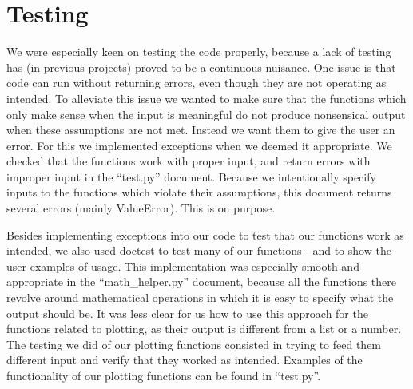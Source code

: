 \documentclass[letterpaper, 12 pt, conference]{ieeeconf}
\begin{document}
\section{Testing}

We were especially keen on testing the code properly, because a lack of testing has (in previous projects) proved to be a continuous nuisance. One issue is that code can run without returning errors, even though they are not operating as intended. To alleviate this issue we wanted to make sure that the functions which only make sense when the input is meaningful do not produce nonsensical output when these assumptions are not met. Instead we want them to give the user an error. For this we implemented exceptions when we deemed it appropriate. We checked that the functions work with proper input, and return errors with improper input in the “test.py” document. Because we intentionally specify inputs to the functions which violate their assumptions, this document returns several errors (mainly ValueError). This is on purpose. 

Besides implementing exceptions into our code to test that our functions work as intended, we also used doctest to test many of our functions - and to show the user examples of usage. This implementation was especially smooth and appropriate in the “math\_helper.py” document, because all the functions there revolve around mathematical operations in which it is easy to specify what the output should be. It was less clear for us how to use this approach for the functions related to plotting, as their output is different from a list or a number. The testing we did of our plotting functions consisted in trying to feed them different input and verify that they worked as intended. Examples of the functionality of our plotting functions can be found in “test.py”. 
\end{document}
